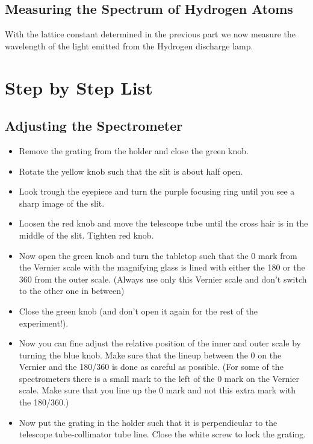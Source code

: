\subsection{Measuring the Spectrum of Hydrogen Atoms}
With the lattice constant determined in the previous part we now measure the wavelength of the light emitted from the Hydrogen discharge lamp.

\section{Step by Step List}
\subsection{Adjusting the Spectrometer}
\begin{itemize}
\item Remove the grating from the holder and close the green knob.

\item Rotate the yellow knob such that the slit is about half open.

\item Look trough the eyepiece and turn the purple focusing ring until you see a sharp image of the slit.

\item Loosen the red knob and move the telescope tube until the cross hair is in the middle of the slit. Tighten red knob.

\item Now open the green knob and turn the tabletop such that the 0 mark from the Vernier scale with the magnifying glass is lined with either the 180 or the 360 from the outer scale. (Always use only this Vernier scale and don't switch to the other one in between)

\item Close the green knob (and don't open it again for the rest of the experiment!).

\item Now you can fine adjust the relative position of the inner and outer scale by turning the blue knob. Make sure that the lineup between the 0 on the Vernier and the 180/360 is done as careful as possible. (For some of the spectrometers there is a small mark to the left of the 0 mark on the Vernier scale. Make sure that you line up the 0 mark and not this extra mark with the 180/360.)

\item Now put the grating in the holder such that it is perpendicular to the telescope tube-collimator tube line. Close the white screw to lock the grating.
\end{itemize}

